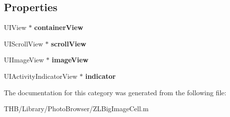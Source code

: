 \subsection*{Properties}
\begin{DoxyCompactItemize}
\item 
\mbox{\label{category_z_l_big_image_cell_07_08_ae1c776a33edf312e175a3d0fcbfe0761}} 
U\+I\+View $\ast$ {\bfseries container\+View}
\item 
\mbox{\label{category_z_l_big_image_cell_07_08_a6567b6a4f9fb42cf67d5fa19e9ff041e}} 
U\+I\+Scroll\+View $\ast$ {\bfseries scroll\+View}
\item 
\mbox{\label{category_z_l_big_image_cell_07_08_a6be783546838525d6607e6470fc52d41}} 
U\+I\+Image\+View $\ast$ {\bfseries image\+View}
\item 
\mbox{\label{category_z_l_big_image_cell_07_08_a203f38038276020fb1cfd3991261331d}} 
U\+I\+Activity\+Indicator\+View $\ast$ {\bfseries indicator}
\end{DoxyCompactItemize}


The documentation for this category was generated from the following file\+:\begin{DoxyCompactItemize}
\item 
T\+H\+B/\+Library/\+Photo\+Browser/Z\+L\+Big\+Image\+Cell.\+m\end{DoxyCompactItemize}
